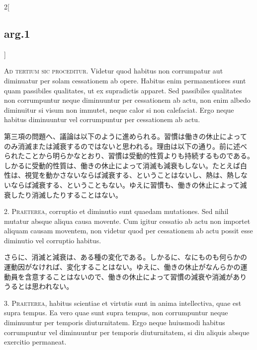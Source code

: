 \documentclass[paper=a4paper,fontsize=10pt,jafontsize=9pt,titlepage]{jlreq}
\begin{document}
\begin{paracol}{2}[\subsection{arg.1}]

{\scshape Ad tertium sic proceditur}. Videtur quod habitus non
corrumpatur aut diminuatur per solam cessationem ab opere. Habitus
enim permanentiores sunt quam passibiles qualitates, ut ex supradictis
apparet. Sed passibiles qualitates non corrumpuntur neque diminuuntur
per cessationem ab actu, non enim albedo diminuitur si visum non
immutet, neque calor si non calefaciat. Ergo neque habitus diminuuntur
vel corrumpuntur per cessationem ab actu.

\switchcolumn

第三項の問題へ、議論は以下のように進められる。習慣は働きの休止によって
のみ消滅または減衰するのではないと思われる。理由は以下の通り。前に述べ
られたことから明らかなとおり、習慣は受動的性質よりも持続するものである。
しかるに受動的性質は、働きの休止によって消滅も減衰もしない。たとえば白
性は、視覚を動かさないならば減衰する、ということはないし、熱は、熱しな
いならば減衰する、ということもない。ゆえに習慣も、働きの休止によって減
衰したり消滅したりすることはない。


2. {\scshape Praeterea}, corruptio et diminutio sunt quaedam
mutationes. Sed nihil mutatur absque aliqua causa movente. Cum igitur
cessatio ab actu non importet aliquam causam moventem, non videtur
quod per cessationem ab actu possit esse diminutio vel corruptio
habitus.

\switchcolumn

さらに、消滅と減衰は、ある種の変化である。しかるに、なにものも何らかの
運動因がなければ、変化することはない。ゆえに、働きの休止がなんらかの運
動員を含意することはないので、働きの休止によって習慣の減衰や消滅があり
うるとは思われない。


3. {\scshape Praeterea}, habitus scientiae et virtutis sunt in anima
intellectiva, quae est supra tempus. Ea vero quae sunt supra tempus,
non corrumpuntur neque diminuuntur per temporis diuturnitatem. Ergo
neque huiusmodi habitus corrumpuntur vel diminuuntur per temporis
diuturnitatem, si diu aliquis absque exercitio permaneat.


\end{paracol}
\end{document}
